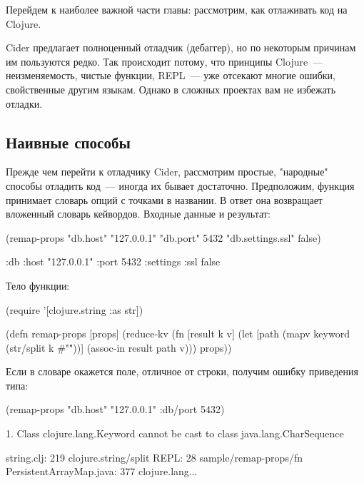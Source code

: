 \label{section-debug}

Перейдем к наиболее важной части главы: рассмотрим, как отлаживать код на Clojure.

Cider предлагает полноценный отладчик (дебаггер), но по некоторым причинам им пользуются редко. Так происходит потому, что принципы Clojure~--- неизменяемость, чистые функции, REPL~--- уже отсекают многие ошибки, свойственные другим языкам. Однако в сложных проектах вам не избежать отладки.

\subsection{Наивные способы}

Прежде чем перейти к отладчику Cider, рассмотрим простые, "народные" способы отладить код~--- иногда их бывает достаточно. Предположим, функция принимает словарь опций с точками в названии. В ответ она возвращает вложенный словарь кейвордов. Входные данные и результат:

\begin{english}
  \begin{clojure}
(remap-props {"db.host" "127.0.0.1"
              "db.port" 5432
              "db.settings.ssl" false})

{:db
 {:host "127.0.0.1"
  :port 5432
  :settings {:ssl false}}}
  \end{clojure}
\end{english}

Тело функции:

\begin{english}
  \begin{clojure}
(require '[clojure.string :as str])

(defn remap-props [props]
  (reduce-kv
   (fn [result k v]
     (let [path
           (mapv keyword (str/split k #"\."))]
       (assoc-in result path v)))
   {}
   props))
  \end{clojure}
\end{english}

Если в словаре окажется поле, отличное от строки, получим ошибку приведения типа:

\begin{english}
  \begin{text}
(remap-props {"db.host" "127.0.0.1" :db/port 5432})

1. Class clojure.lang.Keyword cannot be cast
   to class java.lang.CharSequence

                string.clj:  219  clojure.string/split
                      REPL:   28  sample/remap-props/fn
   PersistentArrayMap.java:  377  clojure.lang...
  \end{text}
\end{english}

